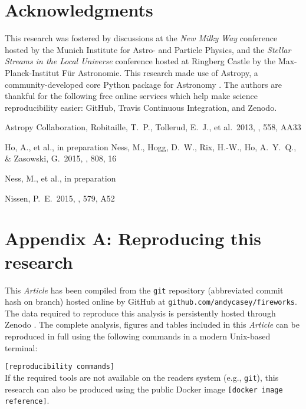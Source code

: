 \documentclass[useAMS,usenatbib]{mn2e}
\newcommand\article{\textit{Article}}
\begin{document}
% 


\section*{Acknowledgments}
This research was fostered by discussions at the \textit{New Milky Way}
conference hosted by the Munich Institute for Astro- and Particle Physics, and
the \textit{Stellar Streams in the Local Universe} conference hosted at Ringberg
Castle by the Max-Planck-Institut F\"ur Astronomie. This research made use of 
Astropy, a community-developed core Python package for Astronomy \citep{astropy}.
The authors are thankful for the following free online services which help make
science reproducibility easier: GitHub, Travis Continuous Integration, and Zenodo.

\begin{thebibliography}{99}
 Astropy Collaboration, Robitaille, T.~P., Tollerud, E.~J., et al.\ 2013, \aap, 558, AA33

 Ho, A., et al., in preparation
 Ness, M., Hogg, D.~W., Rix, H.-W., Ho, A.~Y.~Q., \& Zasowski, G.\ 2015, \apj, 808, 16 

 Ness, M., et al., in preparation

 Nissen, P.~E.\ 2015, \aap, 579, A52 


\end{thebibliography}


\label{lastpage}

\section{Appendix A: Reproducing this research}
This \article{} has been compiled from the \texttt{git} repository (abbreviated commit hash \texttt{\gitAbbrevHash} on \texttt{\gitBranch} branch) hosted online by GitHub at \texttt{github.com/andycasey/fireworks}. The data required to reproduce this analysis is persistently hosted through Zenodo \citep{DATA}. The complete analysis, figures and tables included in this \article{} can be reproduced in full using the following commands in a modern Unix-based terminal:
\vspace{0.5em}

\noindent\texttt{[reproducibility commands]} 
\vspace{0.5em} \\
If the required tools are not available on the readers system (e.g., \texttt{git}), this research can also be produced using the public Docker image \texttt{[docker image reference]}.
\end{document}
